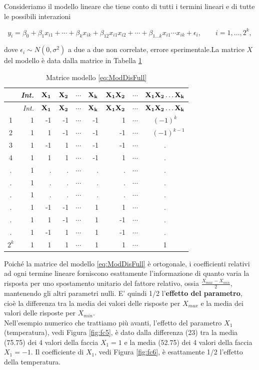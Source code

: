 \documentclass[
  11pt,
]{book}
\begin{document}
Consideriamo il modello lineare che tiene conto di tutti i termini
lineari e di tutte le possibili interazioni

\begin{equation}
y_i=\beta_0+\beta_1x_{i1}+\cdots+\beta_kx_{ik}+\beta_{12}x_{i1}x_{i2}+\cdots+\beta_{1\dots
k}x_{i1} \cdots x_{ik}+\epsilon_i, \qquad i=1,\dots,2^k, 
\label{eq:ModDisFull}
\end{equation}

dove \(\epsilon_i\sim N(0,\sigma^2)\) a due a due non correlate, errore
sperimentale.\newline La matrice \(X\) del modello è data dalla matrice in Tabella \ref{tab:MatrModDisFull}

\begin{longtable}[]{@{}crrrrrrrc@{}}
\caption{\label{tab:MatrModDisFull} Matrice modello \eqref{eq:ModDisFull}}\tabularnewline
\toprule
& \emph{Int.} & \(\bf{X_1}\) & \(\bf{X_2}\) & \(\cdots\) & \(\bf{X_k}\) & \(\bf{X_1X_2}\) & \(\cdots\) & \(\bf{X_1X_2\dots X_k}\)\tabularnewline
\midrule
\endfirsthead
\toprule
& \emph{Int.} & \(\bf{X_1}\) & \(\bf{X_2}\) & \(\cdots\) & \(\bf{X_k}\) & \(\bf{X_1X_2}\) & \(\cdots\) & \(\bf{X_1X_2\dots X_k}\)\tabularnewline
\midrule
\endhead
1 & 1 & -1 & -1 & \(\cdots\) & -1 & 1 & \(\cdots\) & \((-1)^k\)\tabularnewline
2 & 1 & 1 & -1 & \(\cdots\) & -1 & -1 & \(\cdots\) & \(\quad (-1)^{k-1}\)\tabularnewline
3 & 1 & -1 & 1 & \(\cdots\) & -1 & -1 & \(\cdots\) & .\tabularnewline
4 & 1 & 1 & 1 & \(\cdots\) & -1 & 1 & \(\cdots\) & .\tabularnewline
. & 1 & . & . & \(\cdots\) & . & . & \(\cdots\) & .\tabularnewline
. & 1 & . & . & \(\cdots\) & . & . & \(\cdots\) & .\tabularnewline
. & 1 & . & . & \(\cdots\) & . & . & \(\cdots\) & .\tabularnewline
. & 1 & -1 & -1 & \(\cdots\) & 1 & 1 & \(\cdots\) & .\tabularnewline
. & 1 & 1 & -1 & \(\cdots\) & 1 & -1 & \(\cdots\) & .\tabularnewline
. & 1 & -1 & 1 & \(\cdots\) & 1 & -1 & \(\cdots\) & .\tabularnewline
\(2^k\) & 1 & 1 & 1 & \(\cdots\) & 1 & 1 & \(\cdots\) & 1\tabularnewline
\bottomrule
\end{longtable}

Poiché la matrice del modello \eqref{eq:ModDisFull} è ortogonale, i
coefficienti relativi ad ogni termine lineare forniscono esattamente
l'informazione di quanto varia la risposta per uno spostamento unitario
del fattore relativo, ossia \(\frac{X_{max}-X_{min}}{2}\), mantenendo gli
altri parametri nulli. E' quindi 1/2 l'\textbf{effetto del parametro},
cioè la differenza tra la media dei valori delle risposte per \(X_{max}\)
e la media dei valori delle risposte per \(X_{min}\).\\
Nell'esempio numerico che trattiamo più avanti, l'effetto del parametro
\(X_1\) (temperatura), vedi Figura \ref{fig:fc5}, è dato dalla differenza
(23) tra la media (75.75) dei 4 valori della faccia \(X_1=1\) e la media
(52.75) dei 4 valori della faccia \(X_1=-1\). Il coefficiente di \(X_1\),
vedi Figura \ref{fig:fc6}, è esattamente 1/2 l'effetto della temperatura.
\end{document}
